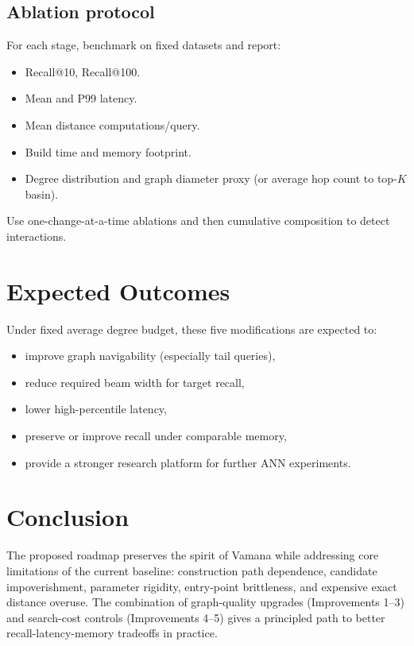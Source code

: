 \documentclass[11pt]{article}
\begin{document}
\subsection{Ablation protocol}
For each stage, benchmark on fixed datasets and report:
\begin{itemize}[leftmargin=*]
    \item Recall@10, Recall@100.
    \item Mean and P99 latency.
    \item Mean distance computations/query.
    \item Build time and memory footprint.
    \item Degree distribution and graph diameter proxy (or average hop count to top-$K$ basin).
\end{itemize}

Use one-change-at-a-time ablations and then cumulative composition to detect interactions.

\section{Expected Outcomes}

Under fixed average degree budget, these five modifications are expected to:
\begin{itemize}[leftmargin=*]
    \item improve graph navigability (especially tail queries),
    \item reduce required beam width for target recall,
    \item lower high-percentile latency,
    \item preserve or improve recall under comparable memory,
    \item provide a stronger research platform for further ANN experiments.
\end{itemize}

\section*{Conclusion}
The proposed roadmap preserves the spirit of Vamana while addressing core limitations of the current baseline: construction path dependence, candidate impoverishment, parameter rigidity, entry-point brittleness, and expensive exact distance overuse. The combination of graph-quality upgrades (Improvements 1--3) and search-cost controls (Improvements 4--5) gives a principled path to better recall-latency-memory tradeoffs in practice.
\end{document}
